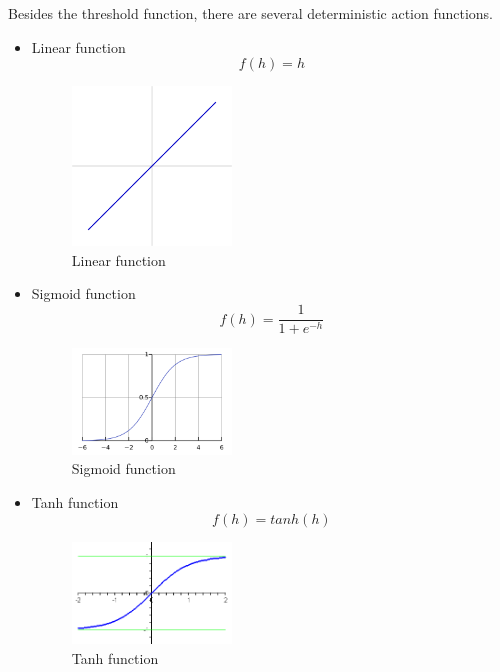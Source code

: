Besides the threshold function, there are several deterministic action functions.
\begin{itemize}
  \item Linear function 
\begin{equation}\label{eq:LinearFunc}
f(h) = h
\end{equation}

\graphicspath{ {./Figures/} }
\begin{figure}[!htb]
\centering
\includegraphics[width=0.4\textwidth]{Linear_function.png}
\caption{\label{fig:LinearFunc}Linear function}
\end{figure}
  
  \item Sigmoid function
\begin{equation}\label{eq:SigmoidFunc}
f(h) = \frac{1}{1+e^{-h}}
\end{equation}

\graphicspath{ {./Figures/} }
\begin{figure}[!htb]
\centering
\includegraphics[width=0.4\textwidth]{Logistic-curve.png}
\caption{\label{fig:SigmoidFunc}Sigmoid function}
\end{figure}

  \item Tanh function
\begin{equation}\label{eq:TanhFunc}
f(h) = tanh(h)
\end{equation}

\graphicspath{ {./Figures/} }
\begin{figure}[!htb]
\centering
\includegraphics[width=0.4\textwidth]{tanh.png}
\caption{\label{fig:TanhFunc}Tanh function}
\end{figure}
\end{itemize}

